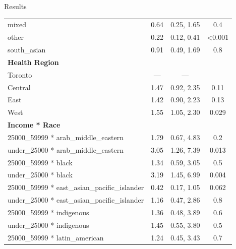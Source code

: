 \documentclass[
  ignorenonframetext,
]{beamer}
\begin{document}
\begin{frame}{Results}
\begin{longtable}{lccc}
\hspace{1em}mixed & 0.64 & 0.25, 1.65 & 0.4\\
\hspace{1em}other & 0.22 & 0.12, 0.41 & <0.001\\
\hspace{1em}south\_asian & 0.91 & 0.49, 1.69 & 0.8\\
\textbf{Health Region} &  &  & \\
\hspace{1em}Toronto & — & — & \\
\hspace{1em}Central & 1.47 & 0.92, 2.35 & 0.11\\
\hspace{1em}East & 1.42 & 0.90, 2.23 & 0.13\\
\hspace{1em}West & 1.55 & 1.05, 2.30 & 0.029\\
\textbf{Income * Race} &  &  & \\
\hspace{1em}25000\_59999 * arab\_middle\_eastern & 1.79 & 0.67, 4.83 & 0.2\\
\hspace{1em}under\_25000 * arab\_middle\_eastern & 3.05 & 1.26, 7.39 & 0.013\\
\hspace{1em}25000\_59999 * black & 1.34 & 0.59, 3.05 & 0.5\\
\hspace{1em}under\_25000 * black & 3.19 & 1.45, 6.99 & 0.004\\
\hspace{1em}25000\_59999 * east\_asian\_pacific\_islander & 0.42 & 0.17, 1.05 & 0.062\\
\hspace{1em}under\_25000 * east\_asian\_pacific\_islander & 1.16 & 0.47, 2.86 & 0.8\\
\hspace{1em}25000\_59999 * indigenous & 1.36 & 0.48, 3.89 & 0.6\\
\hspace{1em}under\_25000 * indigenous & 1.45 & 0.55, 3.80 & 0.5\\
\hspace{1em}25000\_59999 * latin\_american & 1.24 & 0.45, 3.43 & 0.7\\
\end{longtable}
\end{frame}
\end{document}
